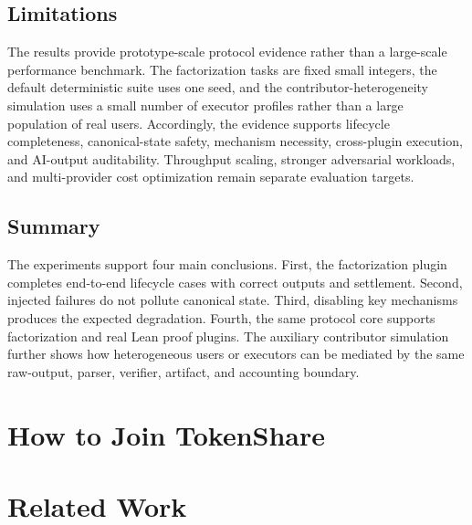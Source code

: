 \documentclass{article}
\theoremstyle{plain}
\begin{document}
\FloatBarrier

\subsection{Limitations}
\label{subsec:limitations}

The results provide prototype-scale protocol evidence rather than a large-scale
performance benchmark. The factorization tasks are fixed small integers, the
default deterministic suite uses one seed, and the contributor-heterogeneity
simulation uses a small number of executor profiles rather than a large
population of real users. Accordingly, the evidence supports lifecycle
completeness, canonical-state safety, mechanism necessity, cross-plugin
execution, and AI-output auditability. Throughput scaling, stronger adversarial
workloads, and multi-provider cost optimization remain separate evaluation
targets.

\subsection{Summary}
\label{subsec:experiment-summary}

The experiments support four main conclusions. First, the factorization plugin
completes end-to-end lifecycle cases with correct outputs and settlement.
Second, injected failures do not pollute canonical state. Third, disabling key
mechanisms produces the expected degradation. Fourth, the same protocol core
supports factorization and real Lean proof plugins. The auxiliary contributor
simulation further shows how heterogeneous users or executors can be mediated by
the same raw-output, parser, verifier, artifact, and accounting boundary.

\makeatletter
\let\@makecaption\TSoldmakecaption
\makeatother
\endgroup
\normalcolor



\section{How to Join TokenShare}





\section{Related Work}
\end{document}
